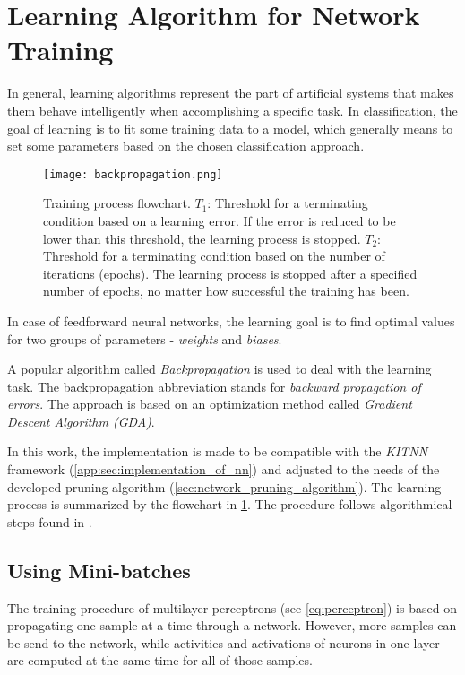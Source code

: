 \section{Learning Algorithm for Network Training} \label{sec:learning_algorithm}
In general, learning algorithms represent the part of artificial systems that makes them behave intelligently when accomplishing a specific task. In classification, the goal of learning is to fit some training data to a model, which generally means to set some parameters based on the chosen classification approach.

\begin{figure}[H]
  \centering
  \texttt{[image: backpropagation.png]}
  \caption{Training process flowchart. $ T_1 $: Threshold for a terminating condition based on a learning error. If the error is reduced to be lower than this threshold, the learning process is stopped. $ T_2 $: Threshold for a terminating condition based on the number of iterations (epochs). The learning process is stopped after a specified number of epochs, no matter how successful the training has been.}
  \label{img:backpropagation}
\end{figure}

In case of feedforward neural networks, the learning goal is to find optimal values for two groups of parameters - \textit{weights} and \textit{biases}.

A popular algorithm called \textit{Backpropagation} is used to deal with the learning task. The backpropagation abbreviation stands for \textit{backward propagation of errors}. The approach is based on an optimization method called \textit{Gradient Descent Algorithm (GDA)}.

In this work, the implementation is made to be compatible with the \textit{KITNN} framework (\cref{app:sec:implementation_of_nn}) and adjusted to the needs of the developed pruning algorithm (\cref{sec:network_pruning_algorithm}). The learning process is summarized by the flowchart in \cref{img:backpropagation}. The procedure follows algorithmical steps found in \citep{online:nn_demystified}.

\subsection{Using Mini-batches} \label{ssec:minibatches}
The training procedure of multilayer perceptrons (see \cref{eq:perceptron}) is based on propagating one sample at a time through a network. However, more samples can be send to the network, while activities and activations of neurons in one layer are computed at the same time for all of those samples.

